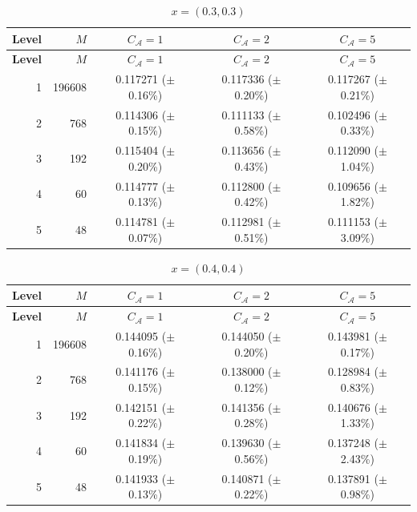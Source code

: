 \documentclass[11pt]{article}
\theoremstyle{definition}
\theoremstyle{plain}
\begin{document}
\begin{appendices}
\begin{longtable}{@{}r r c c c@{}}
\caption{$x=(0.3,0.3)$}\label{tab:mlp-x03}\\
\toprule
\textbf{Level} & \textbf{$M$} & \textbf{$C_{\mathcal A}=1$} & \textbf{$C_{\mathcal A}=2$} & \textbf{$C_{\mathcal A}=5$} \\
\midrule
\endfirsthead
\toprule
\textbf{Level} & \textbf{$M$} & \textbf{$C_{\mathcal A}=1$} & \textbf{$C_{\mathcal A}=2$} & \textbf{$C_{\mathcal A}=5$} \\
\midrule
\endhead
1 & 196608 & 0.117271 (\(\pm\) 0.16\%) & 0.117336 (\(\pm\) 0.20\%) & 0.117267 (\(\pm\) 0.21\%) \\
2 & 768    & 0.114306 (\(\pm\) 0.15\%) & 0.111133 (\(\pm\) 0.58\%) & 0.102496 (\(\pm\) 0.33\%) \\
3 & 192    & 0.115404 (\(\pm\) 0.20\%) & 0.113656 (\(\pm\) 0.43\%) & 0.112090 (\(\pm\) 1.04\%) \\
4 & 60     & 0.114777 (\(\pm\) 0.13\%) & 0.112800 (\(\pm\) 0.42\%) & 0.109656 (\(\pm\) 1.82\%) \\
5 & 48     & 0.114781 (\(\pm\) 0.07\%) & 0.112981 (\(\pm\) 0.51\%) & 0.111153 (\(\pm\) 3.09\%) \\
\bottomrule
\end{longtable}

\begin{longtable}{@{}r r c c c@{}}
\caption{$x=(0.4,0.4)$}\label{tab:mlp-x04}\\
\toprule
\textbf{Level} & \textbf{$M$} & \textbf{$C_{\mathcal A}=1$} & \textbf{$C_{\mathcal A}=2$} & \textbf{$C_{\mathcal A}=5$} \\
\midrule
\endfirsthead
\toprule
\textbf{Level} & \textbf{$M$} & \textbf{$C_{\mathcal A}=1$} & \textbf{$C_{\mathcal A}=2$} & \textbf{$C_{\mathcal A}=5$} \\
\midrule
\endhead
1 & 196608 & 0.144095 (\(\pm\) 0.16\%) & 0.144050 (\(\pm\) 0.20\%) & 0.143981 (\(\pm\) 0.17\%) \\
2 & 768    & 0.141176 (\(\pm\) 0.15\%) & 0.138000 (\(\pm\) 0.12\%) & 0.128984 (\(\pm\) 0.83\%) \\
3 & 192    & 0.142151 (\(\pm\) 0.22\%) & 0.141356 (\(\pm\) 0.28\%) & 0.140676 (\(\pm\) 1.33\%) \\
4 & 60     & 0.141834 (\(\pm\) 0.19\%) & 0.139630 (\(\pm\) 0.56\%) & 0.137248 (\(\pm\) 2.43\%) \\
5 & 48     & 0.141933 (\(\pm\) 0.13\%) & 0.140871 (\(\pm\) 0.22\%) & 0.137891 (\(\pm\) 0.98\%) \\
\bottomrule
\end{longtable}


\end{appendices}
\end{document}

